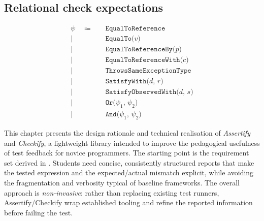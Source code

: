 \subsection*{Relational check expectations}
\begin{align*}
    &&\psi\quad\Coloneqq& \quad\texttt{EqualToReference}&&\\
    &&|& \quad\texttt{EqualTo($v$)}&&\\
    &&|& \quad\texttt{EqualToReferenceBy($p$)}&&\\
    &&|& \quad\texttt{EqualToReferenceWith($c$)}&&\\
    &&|& \quad\texttt{ThrowsSameExceptionType}&&\\
    &&|& \quad\texttt{SatisfyWith($d$, $r$)}&&\\
    &&|& \quad\texttt{SatisfyObservedWith($d$, $s$)}&&\\
    &&|& \quad\texttt{Or($\psi_1$, $\psi_2$)}&&\\
    &&|& \quad\texttt{And($\psi_1$, $\psi_2$)}&&
\end{align*}


\vfill
\pagebreak
\improve


\begin{justify}
This chapter presents the design rationale and technical realisation of \emph{Assertify} and
\emph{Checkify}, a lightweight library intended to improve the pedagogical usefulness of test
feedback for novice programmers. The starting point is the requirement set derived in
. Students need concise, consistently structured reports that make the
tested expression and the expected/actual mismatch explicit, while avoiding the fragmentation and
verbosity typical of baseline frameworks. The overall approach is \emph{non-invasive}: rather than
replacing existing test runners, Assertify/Checkify wrap established tooling and refine the reported
information before failing the test. \cite{becker,barik}
\end{justify}









